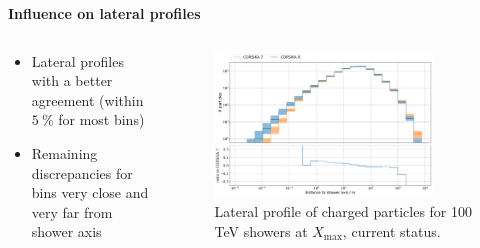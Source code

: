 \documentclass[aspectratio=1610, 9pt]{beamer}
\begin{document}
\begin{frame}
  \textbf{Influence on lateral profiles}
  \vspace{5mm}

      \begin{columns}[onlytextwidth]
        \begin{column}{0.4\textwidth}
            \begin{itemize}
              \item Lateral profiles with a better agreement (within $\SI{5}{\percent}$ for most bins)
              \item Remaining discrepancies for bins very close and very far from shower axis
            \end{itemize}
        \end{column}
        \begin{column}{0.6\textwidth}
            \begin{figure}
                \centering
                \includegraphics[width=0.85\textwidth]{plots/lateral_Charged_r_2023.png}
                \caption{Lateral profile of charged particles for 100 \si{\tera\electronvolt} showers at $X_\text{max}$, current status.}
            \end{figure}
        \end{column}
    \end{columns}

\end{frame}
\end{document}
